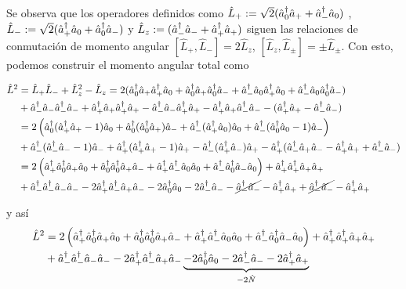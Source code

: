 Se observa que los operadores definidos como $\hat{L}_+ := \sqrt{2}( \crea{0}\anni{+} + \crea{-}\anni{0})$ , $\hat{L}_- := \sqrt{2}( \crea{+}\anni{0} + \crea{0}\anni{-})$ y $\hat{L}_z := ( \crea{-}\anni{-} + \crea{+}\anni{+})$ siguen las relaciones de conmutación de momento angular $\left[ \hat{L}_+, \hat{L}_- \right] = 2\hat{L}_z$, $\left[ \hat{L}_z, \hat{L}_\pm \right] = \pm \hat{L}_\pm$.
Con esto, podemos construir el momento angular total como 


\begin{equation*}
\begin{split}
\hat{L}^2 & = \hat{L}_+\hat{L}_- + \hat{L}_z^2 - \hat{L}_z = 2(  \crea{0}\anni{+}\crea{+}\anni{0} + \crea{0}\anni{+}\crea{0}\anni{-} + \crea{-}\anni{0}\crea{+}\anni{0} + \crea{-}\anni{0}\crea{0}\anni{-}) \\
& + \crea{-}\anni{-}\crea{-}\anni{-} + \crea{+}\anni{+}\crea{+}\anni{+} - \crea{-}\anni{-}\crea{+}\anni{+} - \crea{+}\anni{+}\crea{-}\anni{-} -(\crea{+}\anni{+} -\crea{-}\anni{-}) \\
& = 2\left(  \crea{0}(\crea{+}\anni{+}-1)\anni{0} + \crea{0}(\crea{0}\anni{+})\anni{-} + \crea{-}(\crea{+}\anni{0})\anni{0} + \crea{-}(\crea{0}\anni{0}-1)\anni{-}\right) \\
& + \crea{-}(\crea{-}\anni{-}-1)\anni{-} + \crea{+}(\crea{+}\anni{+}-1)\anni{+} - \crea{-}(\crea{+}\anni{-})\anni{+} - \crea{+}(\crea{-}\anni{+}\anni{-} -\crea{+}\anni{+} + \crea{-}\anni{-}) \\
& = 2\left( \interactt{+}{0}{+}{0} + \interactt{0}{0}{+}{-} +\interactt{+}{-}{0}{0} + \interactt{-}{0}{-}{0}\right) + \interactt{+}{+}{+}{+} \\
& + \interactt{-}{-}{-}{-} -2 \interactt{+}{-}{+}{-} - 2\crea{0}\anni{0} -2\crea{-}\anni{-} -\cancel{\crea{-}\anni{-}} -\crea{+}\anni{+} +\cancel{\crea{-}\anni{-}} -\crea{+}\anni{+}
\end{split}
\end{equation*}

y así
\begin{equation}
\begin{split}
\hat{L}^2 &= 2\left( \interactt{+}{0}{+}{0} + \interactt{0}{0}{+}{-} +\interactt{+}{-}{0}{0} + \interactt{-}{0}{-}{0}\right) + \interactt{+}{+}{+}{+} \\
& + \interactt{-}{-}{-}{-} -2 \interactt{+}{-}{+}{-}  \underbrace{- 2\crea{0}\anni{0} -2\crea{-}\anni{-}  -2\crea{+}\anni{+}}_{-2\hat{N}} 
\end{split}
\end{equation}
\label{lsqrd}

